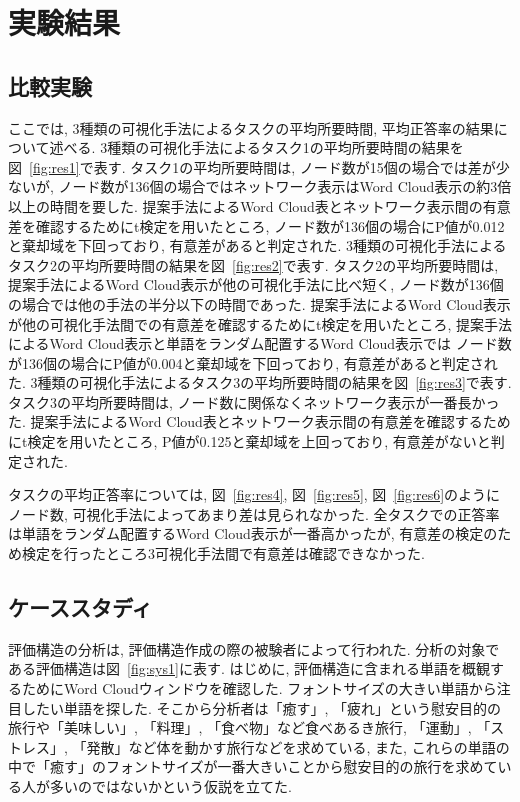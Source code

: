 \documentclass[syuuron]{kuee}
\begin{document}
\chapter{実験結果}
	\section{比較実験}
	ここでは, 3種類の可視化手法によるタスクの平均所要時間, 平均正答率の結果について述べる. 
	3種類の可視化手法によるタスク1の平均所要時間の結果を図~\ref{fig:res1}で表す. 
	タスク1の平均所要時間は, ノード数が15個の場合では差が少ないが, ノード数が136個の場合ではネットワーク表示はWord Cloud表示の約3倍以上の時間を要した. 
	提案手法によるWord Cloud表とネットワーク表示間の有意差を確認するためにt検定を用いたところ, 
	ノード数が136個の場合にP値が0.012と棄却域を下回っており, 有意差があると判定された. 
	3種類の可視化手法によるタスク2の平均所要時間の結果を図~\ref{fig:res2}で表す. 
	タスク2の平均所要時間は, 提案手法によるWord Cloud表示が他の可視化手法に比べ短く, 
	ノード数が136個の場合では他の手法の半分以下の時間であった. 
	提案手法によるWord Cloud表示が他の可視化手法間での有意差を確認するためにt検定を用いたところ, 
	提案手法によるWord Cloud表示と単語をランダム配置するWord Cloud表示では
	ノード数が136個の場合にP値が0.004と棄却域を下回っており, 有意差があると判定された. 
	3種類の可視化手法によるタスク3の平均所要時間の結果を図~\ref{fig:res3}で表す. 
	タスク3の平均所要時間は, ノード数に関係なくネットワーク表示が一番長かった. 
	提案手法によるWord Cloud表とネットワーク表示間の有意差を確認するためにt検定を用いたところ, 
	P値が0.125と棄却域を上回っており, 有意差がないと判定された. 
	
	タスクの平均正答率については, 図~\ref{fig:res4}, 図~\ref{fig:res5}, 図~\ref{fig:res6}のようにノード数, 可視化手法によってあまり差は見られなかった. 
	全タスクでの正答率は単語をランダム配置するWord Cloud表示が一番高かったが, 
	有意差の検定のため検定を行ったところ3可視化手法間で有意差は確認できなかった. 
		
	\section{ケーススタディ}
	評価構造の分析は, 評価構造作成の際の被験者によって行われた. 
	分析の対象である評価構造は図~\ref{fig:sys1}に表す. 
	はじめに, 評価構造に含まれる単語を概観するためにWord Cloudウィンドウを確認した. 
	フォントサイズの大きい単語から注目したい単語を探した. 
	そこから分析者は「癒す」, 「疲れ」という慰安目的の旅行や「美味しい」, 「料理」, 「食べ物」など食べあるき旅行, 
	「運動」, 「ストレス」, 「発散」など体を動かす旅行などを求めている, 
	また, これらの単語の中で「癒す」のフォントサイズが一番大きいことから慰安目的の旅行を求めている人が多いのではないかという仮説を立てた. 
	
\end{document}
